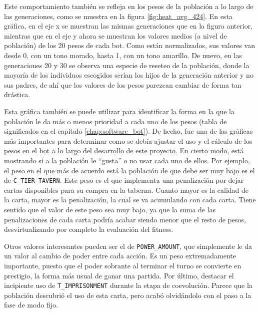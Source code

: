 Este comportamiento también se refleja en los pesos de la población a lo largo de las generaciones, como se muestra en la figura \ref{fig:heat_avg_424}. En esta gráfica, en el eje x se muestran las mismas generaciones que en la figura anterior, mientras que en el eje y ahora se muestran los valores medios (a nivel de población) de los 20 pesos de cada bot. Como están normalizados, sus valores van desde 0, con un tono morado, hasta 1, con un tono amarillo. De nuevo, en las generaciones 20 y 30 se observa una especie de reseteo de la población, donde la mayoría de los individuos escogidos serían los hijos de la generación anterior y no sus padres, de ahí que los valores de los pesos parezcan cambiar de forma tan drástica.

Esta gráfica también se puede utilizar para identificar la forma en la que la población le da más o menos prioridad a cada uno de los pesos (tabla de significados en el capítulo \ref{chap:software_bot}). De hecho, fue una de las gráficas más importantes para determinar como se debía ajustar el uso y el cálculo de los pesos en el bot a lo largo del desarrollo de este proyecto. En cierto modo, está mostrando si a la población le ``gusta'' o no usar cada uno de ellos. Por ejemplo, el peso en el que más de acuerdo está la población de que debe ser muy bajo es el de \texttt{C\_TIER\_TAVERN}. Este peso es el que implementa una penalización por dejar cartas disponibles para su compra en la taberna. Cuanto mayor es la calidad de la carta, mayor es la penalización, la cual se va acumulando con cada carta. Tiene sentido que el valor de este peso sea muy bajo, ya que la suma de las penalizaciones de cada carta podría acabar siendo menor que el resto de pesos, desvirtualizando por completo la evaluación del fitness.

Otros valores interesantes pueden ser el de \texttt{POWER\_AMOUNT}, que simplemente le da un valor al cambio de poder entre cada acción. Es un peso extremadamente importante, puesto que el poder sobrante al terminar el turno se convierte en prestigio, la forma más usual de ganar una partida. Por último, destacar el incipiente uso de \texttt{T\_IMPRISONMENT} durante la etapa de coevolución. Parece que la población descubrió el uso de esta carta, pero acabó olvidándolo con el paso a la fase de modo fijo.

